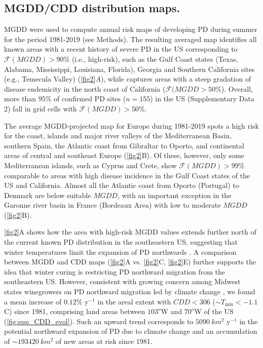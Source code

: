 \subsection{MGDD/CDD distribution maps.}
MGDD were used to compute annual
risk maps of developing PD during summer for the period 1981-2019 (see
Methods). The resulting averaged map identifies all known areas with a recent
history of severe PD in the US corresponding to $\mathcal{F}(MGDD) > 90\%$
(i.e., high-risk), such as the Gulf Coast states (Texas, Alabama, Mississippi,
Louisiana, Florida), Georgia and Southern California sites (e.g., Temecula
Valley) (\cref{fig2}\textit{A}), while captures areas with a steep gradation of
disease endemicity in the north coast of California ($\mathcal{F}(MGDD >
    50\%$). Overall, more than $95\%$ of confirmed PD sites ($n = 155$) in the
    US
    (Supplementary Data 2) fall in grid cells with $\mathcal{F}(MGDD) > 50 \%$.

    The average MGDD-projected map for Europe during 1981-2019 spots a high
    risk
    for the coast, islands and major river valleys of the Mediterranean Basin,
    southern Spain, the Atlantic coast from Gibraltar to Oporto, and
    continental
    areas of central and southeast Europe (\cref{fig2}B). Of these, however,
    only
    some Mediterranean islands, such as Cyprus and Crete, show
$\mathcal{F}(MGDD) >
99\%$ comparable to areas with high disease incidence in the Gulf Coast states
    of the US and California. Almost all the Atlantic coast from Oporto
    (Portugal)
    to Denmark are below suitable $MGDD$, with an important exception in the
    Garonne river basin in France (Bordeaux Area) with low to moderate $MGDD$
    (\cref{fig2}B).

    \cref{fig2}A shows how the area with high-risk MGDD values extends further
    north of the current known PD distribution in the southeastern US,
    suggesting
    that winter temperatures limit the expansion of PD northwards
    \cite{Hopkins2002}. A comparison between MGDD and CDD maps (\cref{fig2}A
    vs.
    \cref{fig2}C, \cref{fig2}E) further supports the idea that winter curing is
    restricting PD northward migration from the southeastern US. However,
    consistent with growing concern among Midwest states winegrowers on PD
    northward migration led by climate change \cite{Galvez2010}, we found a
    mean
    increase of $0.12 \%$ y$^{-1}$ in the areal extent with $CDD < 306$ ($\sim
T_{\textrm{min}} < -1.1$ \textdegree C) since 1981, comprising land areas
    between $103^o$W and $70^o$W of the US (\cref{fig:sup_CDD_evol}). Such an
    upward trend corresponds to $\SI{5090}{km^2}$ y$^{-1}$ in the potential
    northward expansion of PD due to climate change and an accumulation of
$\sim
\SI{193420}{km^2}$ of new areas at risk since 1981.

